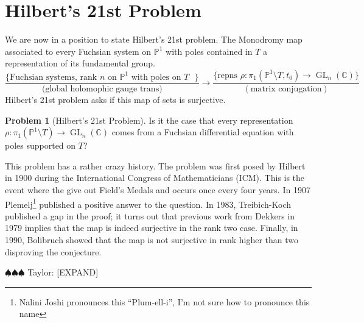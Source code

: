 \documentclass[]{book}
\newcommand{\taylor}[1]{{\color{blue} \sf $\spadesuit\spadesuit\spadesuit$ Taylor: [#1]}}
\numberwithin{equation}{section}
\theoremstyle{definition}
\newtheorem{problem}[theorem]{Problem}
\theoremstyle{remark}
\newcommand{\CC}{\mathbb{C}}
\newcommand{\PP}{\mathbb{P}}
\newcommand{\GL}{\operatorname{GL}}
\begin{document}
\section{Hilbert's 21st Problem}
We are now in a position to state Hilbert's 21st problem. 
The Monodromy map associated to every Fuchsian system on $\PP^1$ with poles contained in $T$ a representation of its fundamental group. 
$$ \frac{\lbrace \mbox{Fuchsian systems, rank $n$ on $\PP^1$ 
		with poles on $T$ } \rbrace}{\mbox{(global holomophic gauge trans)}} \to\frac{\lbrace \mbox{repns $\rho:\pi_1(\PP^1\setminus T, t_0) \to \GL_n(\CC) $}\rbrace}{(\mbox{matrix conjugation})} $$
Hilbert's 21st problem asks if this map of sets is surjective. 
\begin{problem}[Hilbert's 21st Problem]
	Is it the case that every representation $\rho:\pi_1(\PP^1\setminus T) \to \GL_n(\CC)$ comes from a Fuchsian differential equation with poles supported on $T$?
\end{problem}
This problem has a rather crazy history. 
The problem was first posed by Hilbert in 1900 during the International Congress of Mathematicians (ICM). 
This is the event where the give out Field's Medals and occurs once every four years. 
In 1907 Plemelj\footnote{Nalini Joshi pronounces this ``Plum-ell-i'', I'm not sure how to pronounce this name} published a positive answer to the question. 
In 1983, Treibich-Koch published a gap in the proof; it turns out that previous work from Dekkers in 1979 implies that the map is indeed surjective in the rank two case. 
Finally, in 1990, Bolibruch showed that the map is not surjective in rank higher than two disproving the conjecture.

\taylor{EXPAND}

\end{document}
